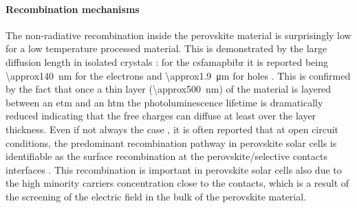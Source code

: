 	\paragraph{Recombination mechanisms}\label{intro_prv_recombination}
	The non-radiative recombination inside the perovskite material is surprisingly low for a low temperature processed material.
	This is demonstrated by the large diffusion length in isolated crystals \cite{Wehrenfennig2014,Wehrenfennig2014a,Stranks2013,Xing2013,Shi2015a,Eperon2014}: for the \gls{csfamapbibr} it is reported being \SI{\approx140}{\nm} for the electrons and \SI{\approx1.9}{\um} for holes \cite{Liu2017}.
	This is confirmed by the fact that once a thin layer (\SI{\approx500}{\nm}) of the material is layered between an \gls{etm} and an \gls{htm} the photoluminescence lifetime is dramatically reduced \cite{Jimenez-Lopez2017,Eperon2014} indicating that the free charges can diffuse at least over the layer thickness.
	Even if not always the case \cite{Valadez-Villalobos2019,Tress2018,Peng2016}, it is often reported that at open circuit conditions, the predominant recombination pathway in perovskite solar cells is identifiable as the surface recombination at the perovskite/selective contacts interfaces \cite{Calado2019,Stolterfoht2018a,Stolterfoht2018,Gelmetti2019,Shao2016,Correa-Baena2017,Hou2016}.
This recombination is important in perovskite solar cells also due to the high minority carriers concentration close to the contacts, which is a result of the screening of the electric field in the bulk of the perovskite material.

